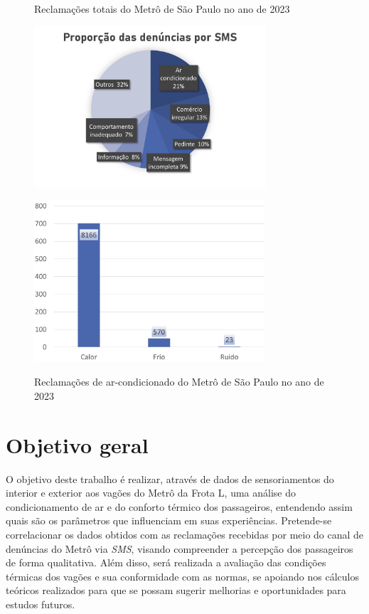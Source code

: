 \documentclass[acronym,symbols,table]{fei}
\begin{document}
\begin{figure}[!htb]
	\centering
	\begin{minipage}{0.5\textwidth}
		\caption{Reclamações totais do Metrô de São Paulo no ano de 2023}
		\includegraphics[width=\linewidth, height=6cm]{Imagens/Grafico_reclamacoes_totais.png}
		\label{fig:grafico_total}
	\end{minipage}\hfill
	\begin{minipage}{0.45\textwidth}
		\caption{Reclamações de ar-condicionado do Metrô de São Paulo no ano de 2023}
		\includegraphics[width=\linewidth, height=6cm]{Imagens/Grafico_reclamacoes_ar.png}
		\label{fig:grafico_ar}
	\end{minipage}
\end{figure}

\newpage 

\section{Objetivo geral}

O objetivo deste trabalho é realizar, através de dados de sensoriamentos do interior e exterior aos vagões do Metrô da Frota L, uma análise do condicionamento de ar e do conforto térmico dos passageiros, entendendo assim quais são os parâmetros que influenciam em suas experiências. Pretende-se correlacionar os dados obtidos com as reclamações recebidas por meio do canal de denúncias do Metrô via \textit{SMS}, visando compreender a percepção dos passageiros de forma qualitativa. Além disso, será realizada a avaliação das condições térmicas dos vagões e sua conformidade com as normas, se apoiando nos cálculos teóricos realizados para que se possam sugerir melhorias e oportunidades para estudos futuros. 
\end{document}
